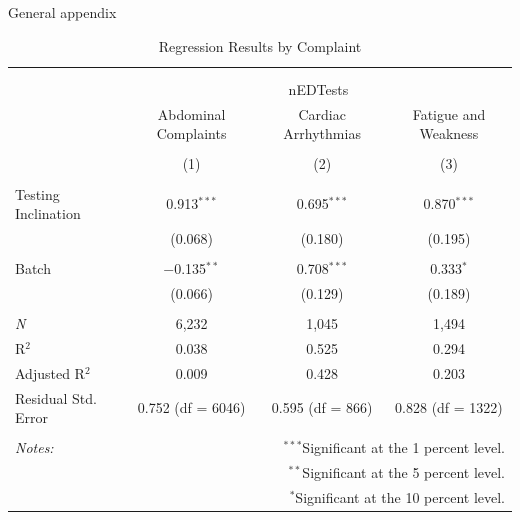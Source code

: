 \documentclass[,,nonblindrev]{informs}
\begin{document}
\begin{APPENDIX}{General appendix}
\begin{table}[!htbp] \centering 
  \caption{Regression Results by Complaint} 
  \label{} 
\begin{tabular}{@{\extracolsep{5pt}}lccc} 
\\[-1.8ex]\hline 
\hline \\[-1.8ex] 
\\[-1.8ex] & \multicolumn{3}{c}{nEDTests} \\ 
 & Abdominal Complaints & Cardiac Arrhythmias & Fatigue and Weakness \\ 
\\[-1.8ex] & (1) & (2) & (3)\\ 
\hline \\[-1.8ex] 
 Testing Inclination & 0.913$^{***}$ & 0.695$^{***}$ & 0.870$^{***}$ \\ 
  & (0.068) & (0.180) & (0.195) \\ 
  & & & \\ 
 Batch & $-$0.135$^{**}$ & 0.708$^{***}$ & 0.333$^{*}$ \\ 
  & (0.066) & (0.129) & (0.189) \\ 
  & & & \\ 
\textit{N} & 6,232 & 1,045 & 1,494 \\ 
R$^{2}$ & 0.038 & 0.525 & 0.294 \\ 
Adjusted R$^{2}$ & 0.009 & 0.428 & 0.203 \\ 
Residual Std. Error & 0.752 (df = 6046) & 0.595 (df = 866) & 0.828 (df = 1322) \\ 
\hline 
\hline \\[-1.8ex] 
\textit{Notes:} & \multicolumn{3}{r}{$^{***}$Significant at the 1 percent level.} \\ 
 & \multicolumn{3}{r}{$^{**}$Significant at the 5 percent level.} \\ 
 & \multicolumn{3}{r}{$^{*}$Significant at the 10 percent level.} \\ 
\end{tabular} 
\end{table}

\end{APPENDIX}

%
%
%





\end{document}
